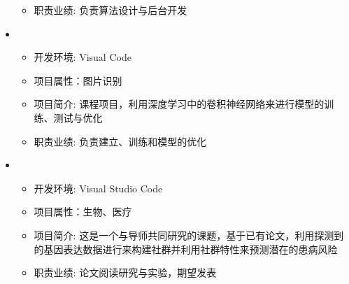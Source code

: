 \begin{itemize}[leftmargin=*]
{\begin{itemize}
      \item 职责业绩: 负责算法设计与后台开发
    \end{itemize}
    }
    \item
    {\small
    \begin{itemize}
      \item 开发环境: Visual Code
      \item 项目属性：图片识别
      \item 项目简介: 课程项目，利用深度学习中的卷积神经网络来进行模型的训练、测试与优化
      \item 职责业绩: 负责建立、训练和模型的优化
    \end{itemize}
    }
    \item {}
    {\small
    \begin{itemize}
      \item 开发环境: Visual Studio Code
      \item 项目属性：生物、医疗
      \item 项目简介: 这是一个与导师共同研究的课题，基于已有论文，利用探测到的基因表达数据进行来构建社群并利用社群特性来预测潜在的患病风险
      \item 职责业绩: 论文阅读研究与实验，期望发表
    \end{itemize}
    }
  \end{itemize}
